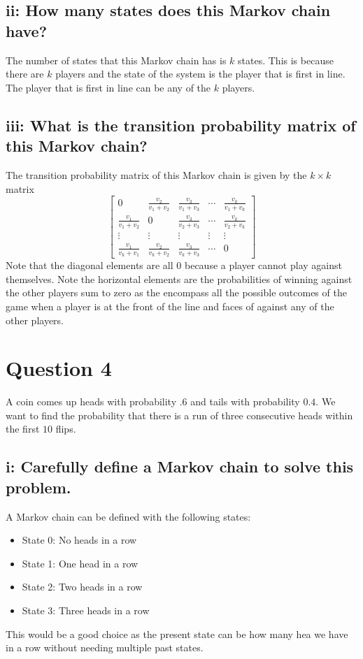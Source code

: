 \documentclass{article}
\begin{document}
\subsection*{ii: How many states does this Markov chain have?}
The number of states that this Markov chain has is $k$ states. This is because there are $k$ players and the state of the system is the player that is first in line. The player that is first in line can be any of the $k$ players.

\subsection*{iii: What is the transition probability matrix of this Markov chain?}
The transition probability matrix of this Markov chain is given by the $k \times k$ matrix 
$$ \begin{bmatrix}
    0 & \frac{v_2}{v_1 + v_2} & \frac{v_3}{v_1 + v_3} & \cdots & \frac{v_k}{v_1 + v_k}\\
    \frac{v_1}{v_1 + v_2} & 0 & \frac{v_3}{v_2 + v_3} & \cdots & \frac{v_k}{v_2 + v_k}\\
    \vdots & \vdots & \vdots & \vdots & \vdots\\
    \frac{v_1}{v_k + v_1} & \frac{v_2}{v_k + v_2} & \frac{v_3}{v_k + v_3} & \cdots & 0
\end{bmatrix}$$
Note that the diagonal elements are all $0$ because a player cannot play against themselves.
Note the horizontal elements are the probabilities of winning against the other players sum to zero as the encompass all the possible outcomes of the game when a player is at the front of the line and faces of against any of the other players.




\section*{Question 4}
A coin comes up heads with probability $.6$ and tails with probability $0.4$. We
want to find the probability that there is a run of three consecutive heads
within the first $10$ flips.
\subsection*{i: Carefully define a Markov chain to solve this problem.}
A Markov chain can be defined with the following states:
\begin{itemize}
    \item State 0: No heads in a row
    \item State 1: One head in a row
    \item State 2: Two heads in a row
    \item State 3: Three heads in a row
\end{itemize}
This would be a good choice as the present state can be how many hea we have in a row without needing multiple past states. 
\end{document}
